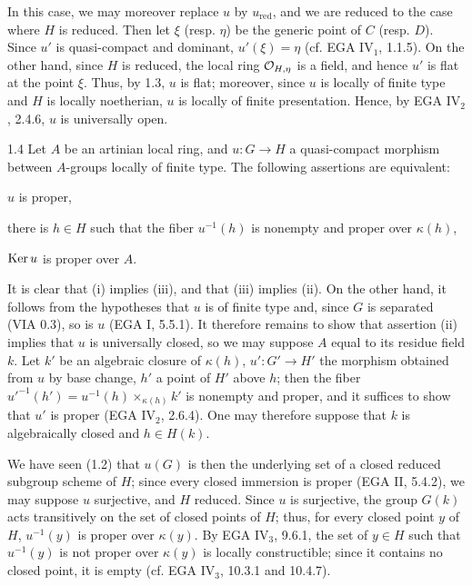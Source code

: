 In this case, we may moreover replace $u$ by $u_{\mathrm{red}}$, and we are reduced to the case where $H$ is reduced. Then let $\xi$ (resp. $\eta$) be the generic point of $C$ (resp. $D$). Since $u'$ is quasi-compact and dominant, $u'(\xi)=\eta$ (cf. EGA IV$_1$, 1.1.5). On the other hand, since $H$ is reduced, the local ring $\mathcal{O}_{H,\eta}$ is a field, and hence $u'$ is flat at the point $\xi$. Thus, by 1.3, $u$ is flat; moreover, since $u$ is locally of finite type and $H$ is locally noetherian, $u$ is locally of finite presentation. Hence, by EGA IV$_2$, 2.4.6, $u$ is universally open.
\begin{proposition}{1.4}\label{VIB.1.4}
Let $A$ be an artinian local ring, and $u:G\to H$ a quasi-compact morphism between $A$-groups locally of finite type. The following assertions are equivalent:
\begin{enumeratei}
\item $u$ is proper,
\item there is $h\in H$ such that the fiber $u^{-1}(h)$ is nonempty and proper over $\kappa(h)$,
\item $\operatorname{Ker} u$ is proper over $A$.
\end{enumeratei}
\end{proposition}
It is clear that (i) implies (iii), and that (iii) implies (ii). On the other hand, it follows from the hypotheses that $u$ is of finite type and, since $G$ is separated (VIA 0.3), so is $u$ (EGA I, 5.5.1). It therefore remains to show that assertion (ii) implies that $u$ is universally closed, so we may suppose $A$ equal to its residue field $k$. Let $k'$ be an algebraic closure of $\kappa(h)$, $u':G'\to H'$ the morphism obtained from $u$ by base change, $h'$ a point of $H'$ above $h$; then the fiber $u'^{-1}(h')=u^{-1}(h)\times_{\kappa(h)}k'$ is nonempty and proper, and it suffices to show that $u'$ is proper (EGA IV$_2$, 2.6.4). One may therefore suppose that $k$ is algebraically closed and $h\in H(k)$.

We have seen (1.2) that $u(G)$ is then the underlying set of a closed reduced subgroup scheme of $H$; since every closed immersion is proper (EGA II, 5.4.2), we may suppose $u$ surjective, and $H$ reduced. Since $u$ is surjective, the group $G(k)$ acts transitively on the set of closed points of $H$; thus, for every closed point $y$ of $H$, $u^{-1}(y)$ is proper over $\kappa(y)$. By EGA IV$_3$, 9.6.1, the set of $y\in H$ such that $u^{-1}(y)$ is not proper over $\kappa(y)$ is locally constructible; since it contains no closed point, it is empty (cf. EGA IV$_3$, 10.3.1 and 10.4.7).

